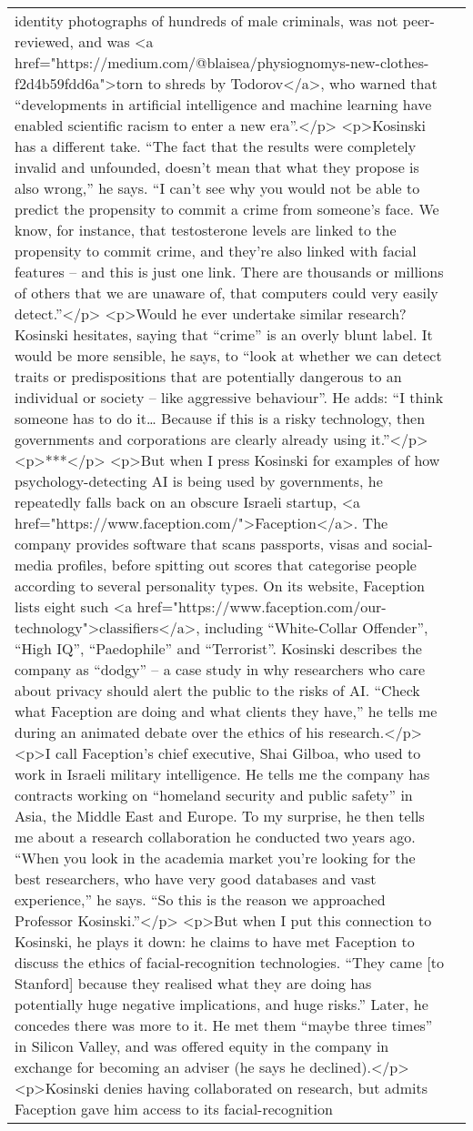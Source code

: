 \documentclass[]{article}
\begin{document}
\begin{table}[!h]
{\begin{tabular}[t]{ll}
identity photographs of hundreds of male criminals, was not peer-reviewed, and was <a href="https://medium.com/@blaisea/physiognomys-new-clothes-f2d4b59fdd6a">torn to shreds by Todorov</a>, who warned that “developments in artificial intelligence and machine learning have enabled scientific racism to enter a new era”.</p> <p>Kosinski has a different take. “The fact that the results were completely invalid and unfounded, doesn’t mean that what they propose is also wrong,” he says. “I can’t see why you would not be able to predict the propensity to commit a crime from someone’s face. We know, for instance, that testosterone levels are linked to the propensity to commit crime, and they’re also linked with facial features – and this is just one link. There are thousands or millions of others that we are unaware of, that computers could very easily detect.”</p> <p>Would he ever undertake similar research? Kosinski hesitates, saying that “crime” is an overly blunt label. It would be more sensible, he says, to “look at whether we can detect traits or predispositions that are potentially dangerous to an individual or society – like aggressive behaviour”. He adds: “I think someone has to do it… Because if this is a risky technology, then governments and corporations are clearly already using it.”</p> <p>***</p> <p>But when I press Kosinski for examples of how psychology-detecting AI is being used by governments, he repeatedly falls back on an obscure Israeli startup, <a href="https://www.faception.com/">Faception</a>. The company provides software that scans passports, visas and social-media profiles, before spitting out scores that categorise people according to several personality types. On its website, Faception lists eight such <a href="https://www.faception.com/our-technology">classifiers</a>, including “White-Collar Offender”, “High IQ”, “Paedophile” and “Terrorist”. Kosinski describes the company as “dodgy” – a case study in why researchers who care about privacy should alert the public to the risks of AI. “Check what Faception are doing and what clients they have,” he tells me during an animated debate over the ethics of his research.</p> <p>I call Faception’s chief executive, Shai Gilboa, who used to work in Israeli military intelligence. He tells me the company has contracts working on “homeland security and public safety” in Asia, the Middle East and Europe. To my surprise, he then tells me about a research collaboration he conducted two years ago. “When you look in the academia market you’re looking for the best researchers, who have very good databases and vast experience,” he says. “So this is the reason we approached Professor Kosinski.”</p> <p>But when I put this connection to Kosinski, he plays it down: he claims to have met Faception to discuss the ethics of facial-recognition technologies. “They came [to Stanford] because they realised what they are doing has potentially huge negative implications, and huge risks.” Later, he concedes there was more to it. He met them “maybe three times” in Silicon Valley, and was offered equity in the company in exchange for becoming an adviser (he says he declined).</p> <p>Kosinski denies having collaborated on research, but admits Faception gave him access to its facial-recognition 
\end{tabular}}
\end{table}
\end{document}
